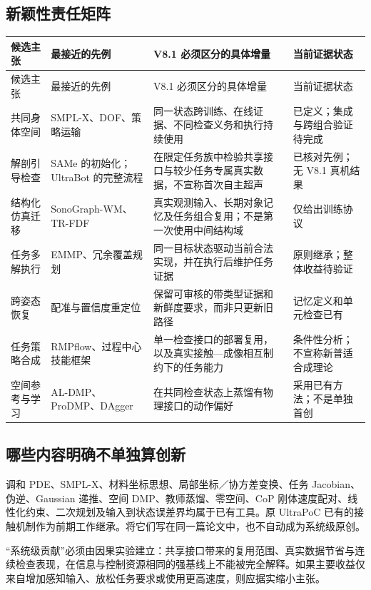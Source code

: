 \documentclass[UTF8,11pt,a4paper,fontset=fandol]{ctexart}
\numberwithin{equation}{section}
\theoremstyle{definition}
\begin{document}
\subsection{新颖性责任矩阵}
\small
\begin{longtable}{@{}P{23mm}P{42mm}P{49mm}P{36mm}@{}}
\toprule
候选主张 & 最接近的先例 & V8.1 必须区分的具体增量 & 当前证据状态\\\midrule
\endfirsthead
\toprule 候选主张 & 最接近的先例 & V8.1 必须区分的具体增量 & 当前证据状态\\\midrule
\endhead
共同身体空间 & SMPL-X、DOF、策略运输\cite{smplx,dof,transport} & 同一状态跨训练、在线证据、不同检查义务和执行持续使用 & 已定义；集成与跨组合验证待完成\\
解剖引导检查 & SAMe 的初始化；UltraBot 的完整流程\cite{same,ultrabot} & 在限定任务族中检验共享接口与较少任务专属真实数据，不宣称首次自主超声 & 已核对先例；无 V8.1 真机结果\\
结构化仿真迁移 & SonoGraph-WM、TR-FDF\cite{sonograph,trfdf} & 真实观测输入、长期对象记忆及任务组合复用；不是第一次使用中间结构域 & 仅给出训练协议\\
任务多解执行 & EMMP、冗余覆盖规划\cite{emmp,coverageplan} & 同一目标状态驱动当前合法实现，并在执行后维护任务证据 & 原则继承；整体收益待验证\\
跨姿态恢复 & 配准与置信度重定位\cite{reposition} & 保留可审核的带类型证据和新鲜度要求，而非只更新旧路径 & 记忆定义和单元检查已有\\
任务策略合成 & RMPflow、过程中心技能框架\cite{rmpflow,taxonomy} & 单一检查接口的部署复用，以及真实接触—成像相互制约下的任务能力 & 条件性分析；不宣称新普适合成理论\\
空间参考与学习 & AL-DMP、ProDMP、DAgger\cite{aldmp,prodmp,dagger} & 在共同检查状态上蒸馏有物理接口的动作偏好 & 采用已有方法；不是单独首创\\\bottomrule
\end{longtable}
\normalsize

\subsection{哪些内容明确不单独算创新}
调和 PDE、SMPL-X、材料坐标思想、局部坐标／协方差变换、任务 Jacobian、伪逆、Gaussian 递推、空间 DMP、教师蒸馏、零空间、CoP 刚体速度配对、线性化约束、二次规划及输入到状态误差界均属于已有工具。原 UltraPoC 已有的接触机制作为前期工作继承。将它们写在同一篇论文中，也不自动成为系统级原创。

“系统级贡献”必须由因果实验建立：共享接口带来的复用范围、真实数据节省与连续检查表现，在信息与控制资源相同的强基线上不能被完全解释。如果主要收益仅来自增加感知输入、放松任务要求或使用更高速度，则应据实缩小主张。
\end{document}
